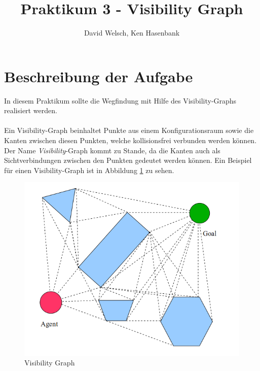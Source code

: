 \documentclass[a4paper]{scrartcl}
\begin{document}
\titlehead{Wintersemester 2017/2018\\Motion Planning\\Prof. Horsch, Rudi Scheitler}
\author{David Welsch, Ken Hasenbank}
\title{Praktikum 3 - Visibility Graph}
\maketitle

\section*{Beschreibung der Aufgabe}

In diesem Praktikum sollte die Wegfindung mit Hilfe des Visibility-Graphs realisiert werden.
\\\\
Ein Visibility-Graph beinhaltet Punkte aus einem Konfigurationsraum sowie die Kanten zwischen diesen Punkten, welche kollisionsfrei verbunden werden können. Der Name \textit{Visibility}-Graph kommt zu Stande, da die Kanten auch als Sichtverbindungen zwischen den Punkten gedeutet werden können. Ein Beispiel für einen Visibility-Graph ist in Abbildung \ref{img:GraphBsp} zu sehen.\\
\begin{figure}[h!]
\includegraphics[width=\textwidth]{graph1.png}
\caption{Visibility Graph}
\label{img:GraphBsp}
\end{figure}
\end{document}
